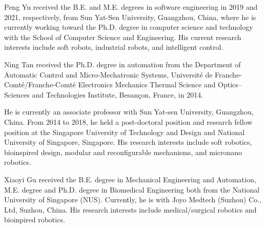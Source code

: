 \documentclass[journal,twoside,web]{ieeecolor}
\begin{document}
\begin{IEEEbiography}
   {Peng Yu} received the B.E. and M.E. degrees in software engineering in 2019 and 2021, respectively, from Sun Yat-Sen University, Guangzhou, China, where he is currently working toward the Ph.D. degree in computer science and technology with the School of Computer Science and Engineering. His current research interests include soft robots, industrial robots, and intelligent control.
\end{IEEEbiography}
\begin{IEEEbiography}
   {Ning Tan} received the Ph.D. degree in automation from the Department of Automatic Control and Micro-Mechatronic Systems, Université de Franche-Comté/Franche-Comté Electronics Mechanics Thermal Science and Optics–Sciences and Technologies Institute, Besançon, France, in 2014.

   He is currently an associate professor with Sun Yat-sen University, Guangzhou, China. From 2014 to 2018, he held a post-doctoral position and research fellow position at the Singapore University of Technology and Design and National University of Singapore, Singapore. His research interests include soft robotics, bioinspired design, modular and reconfigurable mechanisms, and micronano robotics.
\end{IEEEbiography}
\begin{IEEEbiography}
   {Xiaoyi Gu} received the B.E. degree in Mechanical Engineering and Automation, M.E. degree and Ph.D. degree in Biomedical Engineering both from the National University of Singapore (NUS). Currently, he is with Joyo Medtech (Suzhou) Co., Ltd, Suzhou, China. His research interests include medical/surgical robotics and bioinpired robotics.
\end{IEEEbiography}
\end{document}
